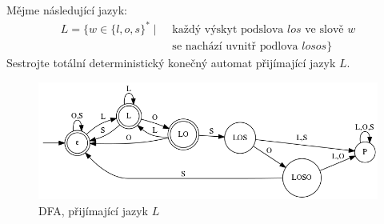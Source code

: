 \documentclass[12pt]{ib102}
\begin{document}
\begin{zadani}
Mějme následující jazyk:
\begin{align*}
L = \{w \in \{l,o,s\}^* \mid &\text{ každý výskyt podslova } los \text{ ve slově } w \\
&\text{ se nachází uvnitř podlova } losos \}
\end{align*}
Sestrojte totální deterministický konečný automat přijímající jazyk $L$.
\end{zadani}

\begin{reseni}
\begin{figure}[h!]
\centering
\includegraphics[width=0.8\linewidth]{losos.png}
\caption{DFA, přijímající jazyk \( L \)}
\end{figure}
\end{reseni}
\end{document}
